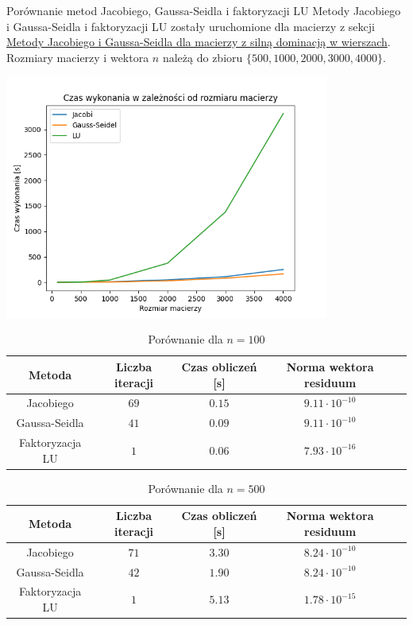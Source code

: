 \documentclass{article}
\begin{document}
\begin{section}{Porównanie metod Jacobiego, Gaussa-Seidla i faktoryzacji LU}
    Metody Jacobiego i Gaussa-Seidla i faktoryzacji LU zostały uruchomione dla macierzy z sekcji 
    \hyperref[sec:1]{Metody Jacobiego i Gaussa-Seidla dla macierzy z silną dominacją w wierszach}.
    Rozmiary macierzy i wektora $n$ należą do zbioru $\{500, 1000, 2000, 3000, 4000\}$.

    \begin{center}
        \includegraphics[width=0.8\textwidth]{czas_wykonania.png}
    \end{center}

    \begin{table}
        \centering
        \begin{tabular}{|c|c|c|c|c|}
            \hline
            Metoda & Liczba iteracji & Czas obliczeń [s] & Norma wektora residuum \\
            \hline
            Jacobiego & $69$ & $0.15$ & $9.11\cdot10^{-10}$ \\
            Gaussa-Seidla & $41$ & $0.09$ & $9.11\cdot10^{-10}$ \\
            Faktoryzacja LU & $1$ & $0.06$ & $7.93\cdot10^{-16}$ \\
            \hline
        \end{tabular}
        \caption{Porównanie dla $n = 100$}
    \end{table}

    \begin{table}
        \centering
        \begin{tabular}{|c|c|c|c|c|}
            \hline
            Metoda & Liczba iteracji & Czas obliczeń [s] & Norma wektora residuum \\
            \hline
            Jacobiego & $71$ & $3.30$ & $8.24\cdot10^{-10}$ \\
            Gaussa-Seidla & $42$ & $1.90$ & $8.24\cdot10^{-10}$ \\
            Faktoryzacja LU & $1$ & $5.13$ & $1.78\cdot10^{-15}$ \\
            \hline
        \end{tabular}
        \caption{Porównanie dla $n = 500$}
    \end{table}


\end{section}
\end{document}
